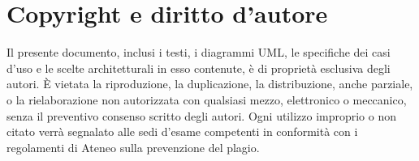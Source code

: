 \section{Copyright e diritto d'autore}
Il presente documento, inclusi i testi, i diagrammi UML, le specifiche dei casi d'uso e le scelte architetturali in esso contenute, \`e di propriet\`a esclusiva degli autori. \`E vietata la riproduzione, la duplicazione, la distribuzione, anche parziale, o la rielaborazione non autorizzata con qualsiasi mezzo, elettronico o meccanico, senza il preventivo consenso scritto degli autori. Ogni utilizzo improprio o non citato verr\`a segnalato alle sedi d'esame competenti in conformit\`a con i regolamenti di Ateneo sulla prevenzione del plagio.